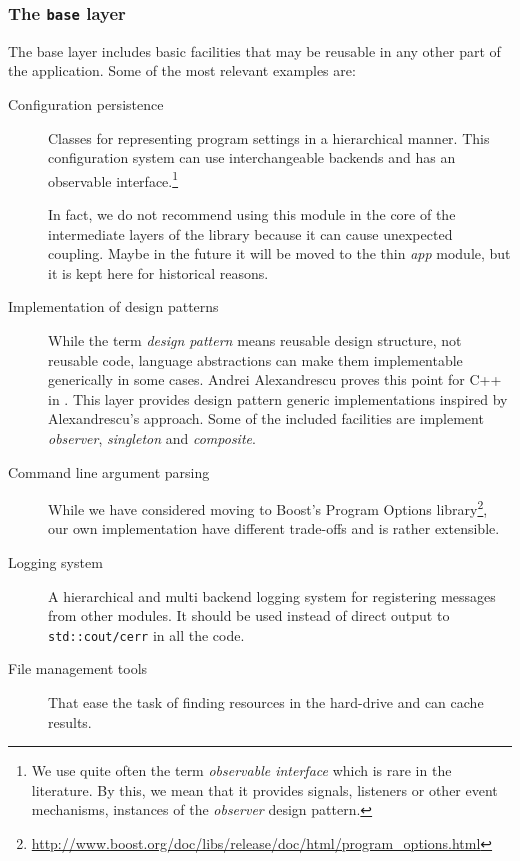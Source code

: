 \subsubsection{The \texttt{base} layer}

The base layer includes basic facilities that may
be reusable in any other part of the application. Some of the most
relevant examples are:

\begin{description}
\item[Configuration persistence] Classes for representing program
  settings in a hierarchical manner. This configuration system can use
  interchangeable backends and has an observable
  interface.\footnote{We use quite often the term \emph{observable
      interface} which is rare in the literature. By this, we mean
    that it provides signals, listeners or other event mechanisms,
    instances of the \emph{observer} design
    pattern\cite{gamma95design}.}

  In fact, we do not recommend using this module in the core of the
  intermediate layers of the library because it can cause unexpected
  coupling. Maybe in the future it will be moved to the thin
  \emph{app} module, but it is kept here for historical reasons.

\item[Implementation of design patterns] While the term \emph{design
    pattern} means reusable design structure,
  not reusable code, language abstractions can make them implementable
  generically in some cases. Andrei Alexandrescu proves this point for
  C++ in \cite{alexandrescu01modern}. This layer provides design
  pattern generic implementations inspired by Alexandrescu's
  approach. Some of the included facilities are implement
  \emph{observer}, \emph{singleton} and \emph{composite}.

\item[Command line argument parsing]
  While we have considered moving to Boost's Program Options
  library\footnote{\url{http://www.boost.org/doc/libs/release/doc/html/program_options.html}},
  our own implementation have different trade-offs and is rather
  extensible.

\item[Logging system] A hierarchical and multi backend
  logging system for registering messages from other modules. It
  should be used instead of direct output to \texttt{std::cout/cerr}
  in all the code.

\item[File management tools] That ease the task of finding resources
  in the hard-drive and can cache results.
\end{description}

